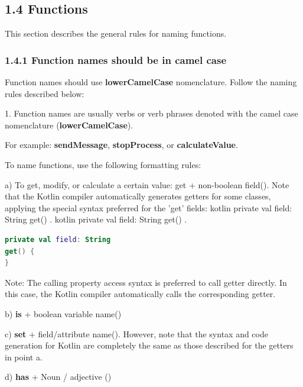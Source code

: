 {{{{{{{{{{{{{{{{\subsection*{\textbf{1.4 Functions}}

\label{sec:1.4}

This section describes the general rules for naming functions.

\subsubsection*{\textbf{1.4.1 Function names should be in camel case}}
\leavevmode\newline

\label{sec:1.4.1}

Function names should use \textbf{lowerCamelCase} nomenclature. Follow the naming rules described below:

1.	Function names are usually verbs or verb phrases denoted with the camel case nomenclature (\textbf{lowerCamelCase}).

For example: \textbf{sendMessage}, \textbf{stopProcess}, or \textbf{calculateValue}.

To name functions, use the following formatting rules:



a) To get, modify, or calculate a certain value: get + non-boolean field(). Note that the Kotlin compiler automatically generates getters for some classes, applying the special syntax preferred for the 'get' fields: kotlin private val field: String get() { }. kotlin private val field: String get() { }.

\begin{lstlisting}[language=Kotlin]
private val field: String
get() {
}
\end{lstlisting}
Note: The calling property access syntax is preferred to call getter directly. In this case, the Kotlin compiler automatically calls the corresponding getter.



b) \textbf{is} + boolean variable name()



c) \textbf{set} + field/attribute name(). However, note that the syntax and code generation for Kotlin are completely the same as those described for the getters in point a.



d) \textbf{has} + Noun / adjective ()



}}}}}}}}}}}}}}}}
